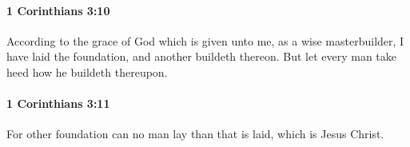 		\paragraph{1 Corinthians 3:10} %
			\label{1CORINTHIANS-3-10}

			According to the grace of God which is given unto me, as a wise masterbuilder, I have laid the foundation, and another buildeth thereon. But let every man take heed how he buildeth thereupon.

			\begin{framed}
			\scriptsize
				\begin{compactdesc}
					\item[SBLG] 
				\end{compactdesc}
			\end{framed}

		\paragraph{1 Corinthians 3:11} %
			\label{1CORINTHIANS-3-11}

			For other foundation can no man lay than that is laid, which is Jesus Christ.

